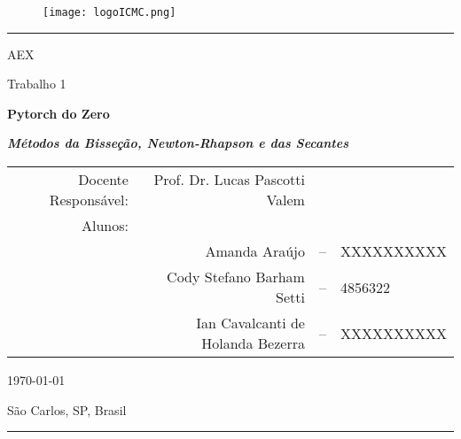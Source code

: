 \begin{center}
	\begin{figure}[h!]
		\centering
		\texttt{[image: logoICMC.png]}
	\end{figure}

	\rule{0.95\textwidth}{1.5pt}

	\vspace*{2mm}

	{AEX \par}

	\vspace*{1mm}

	{\large Trabalho 1\par}

	\vspace*{3mm}

	{\Large\textbf{Pytorch do Zero}\par}
	
	\vspace*{3mm}

	{\large\textbf{\emph{Métodos da Bisseção, Newton-Rhapson e das Secantes}}}

	\vspace*{8mm}

	\begin{tabular}{rrcl}
        Docente Responsável: & Prof. Dr. Lucas Pascotti Valem \\
        Alunos: & \\
        & Amanda Araújo & -- & XXXXXXXXXX \\
		& Cody Stefano Barham Setti & -- & 4856322 \\
		& Ian Cavalcanti de Holanda Bezerra & -- & XXXXXXXXXX
	\end{tabular}

	\vspace*{8mm}
	
	{\normalsize \today\par}

	\vspace*{2mm}

	{\normalsize São Carlos, SP, Brasil\par}

	\vspace*{2mm}

	\rule{0.95\textwidth}{1.5pt}
\end{center}
\vspace*{5mm}
